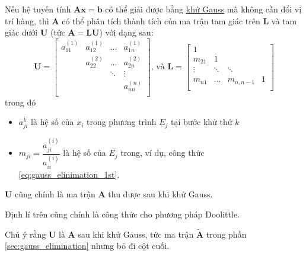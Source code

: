 \documentclass[../../Lectures]{subfiles}
\begin{document}
\begin{theorem}\label{thm:lu_doolittle}
    Nếu hệ tuyến tính \(\bm{Ax} = \bm{b}\) có thể giải được bằng
    \hyperref[method:gauss_elimination]{khử Gauss} mà không cần đổi vị trí hàng,
    thì \(\bm{A}\) có thể phân tích thành tích của ma trận tam giác trên
    \(\bm{L}\) và tam giác dưới \(\bm{U}\) (tức \(\bm{A} = \bm{LU}\)) với dạng
    sau:
    \[
        \bm{U} =
            \begin{bmatrix}
                a_{11}^{(1)}  &  a_{12}^{(1)}  &  \dots   &  a_{1n}^{(1)}  \\
                              &  a_{22}^{(2)}  &  \dots   &  a_{2n}^{(2)}  \\
                              &                &  \ddots  &     \vdots     \\
                              &                &          &  a_{nn}^{(n)}  \\
            \end{bmatrix}
        \text{, và }
        \bm{L} =
            \begin{bmatrix}
                    1   &          &                &     \\
                m_{21}  &     1    &                &     \\
                \vdots  &  \ddots  &     \ddots     &     \\
                m_{n1}  &  \dots   &  m_{n, n - 1}  &  1  \\
            \end{bmatrix}
    \]
    trong đó
    \begin{itemize}
        \item \(a_{ji}^{k}\) là hệ số của \(x_i\) trong phương trình \(E_j\) tại
            bước khử thứ \(k\)

        \item \(m_{ji} = \dfrac{a_{ji}^{(i)}}{a_{ii}^{(i)}}\) là hệ số của
            \(E_j\) trong, ví dụ, công thức \eqref{eq:gauss_elinimation_1st}.
    \end{itemize}

    \(\bm{U}\) cũng chính là ma trận \(\bm{A}\) thu được sau khi khử Gauss.
\end{theorem}

Định lí trên cũng chính là công thức cho phương pháp Doolittle.

Chú ý rằng \(\bm{U}\) là \(\bm{A}\) sau khi khử Gauss, tức ma trận
\(\bm{\tilde{A}}\) trong phần \ref{sec:gauss_elimination} nhưng bỏ đi cột cuối.
\end{document}
